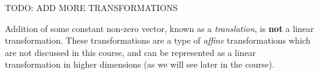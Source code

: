 %
%
% 
%
%
%  

TODO: ADD MORE TRANSFORMATIONS

\begin{warning}
  Addition of some constant non-zero vector, known as a \emph{translation}, is \textbf{not} a linear transformation. These transformations are a type of \emph{affine} transformations which are not discussed in this course, and can be represented as a linear transformation in higher dimensions (as we will see later in the course).
\end{warning}

